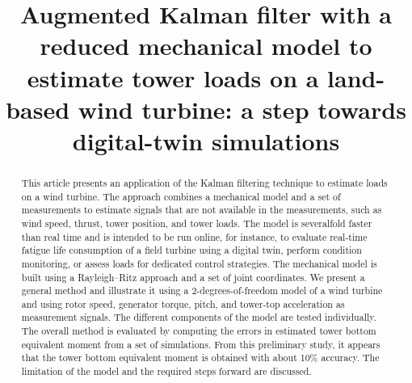 \documentclass[wes, manuscript]{copernicus}
\begin{document}
\title{Augmented Kalman filter with a reduced mechanical model to estimate tower loads on a land-based wind turbine: a step towards digital-twin simulations}




\received{}
\pubdiscuss{} %
\revised{}
\accepted{}
\published{}


\maketitle


\begin{abstract}
This article presents an application of the Kalman filtering technique to estimate loads on a wind turbine. The approach combines a mechanical model and a set of measurements to estimate signals that are not available in the measurements, such as wind speed, thrust, tower position, and tower loads. The model is severalfold faster than real time and is intended to be run online, for instance, to evaluate real-time fatigue life consumption of a field turbine using a digital twin, perform  condition monitoring,  or assess loads for dedicated control strategies. The mechanical model is built using a Rayleigh–Ritz approach and a set of joint coordinates. We present a general method and illustrate it using a 2-degrees-of-freedom model of a wind turbine and using rotor speed, generator torque, pitch, and tower-top acceleration as measurement signals. The different components of the model are tested individually. The overall method is evaluated by computing the errors in estimated tower bottom equivalent moment from a set of simulations. From this preliminary study, it appears that the tower bottom equivalent moment is obtained with about 10\% accuracy. The limitation of the model and the required steps forward are discussed.
\end{abstract}
\end{document}
